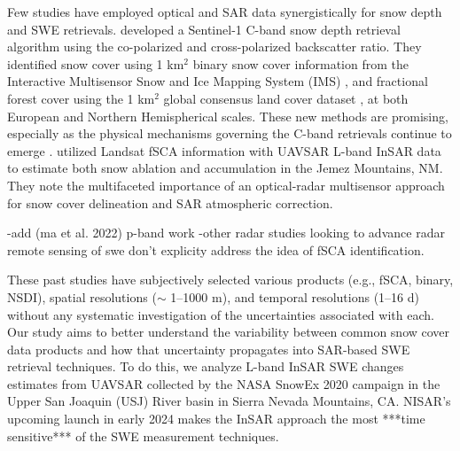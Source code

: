 Few studies have employed optical and SAR data synergistically for snow depth and SWE retrievals. \cite{lievensSnowDepthVariability2019,lievensSentinel1SnowDepth2022} developed a Sentinel-1 C-band snow depth retrieval algorithm using the co-polarized and cross-polarized backscatter ratio. They identified snow cover using 1 km$^{2}$ binary snow cover information from the Interactive Multisensor Snow and Ice Mapping System (IMS) \citep{u.s.nationalicecenterIMSDailyNorthern2008, ramsayInteractiveMultisensorSnow1998, helfrichEnhancementsForthcomingDevelopments2007}, and fractional forest cover using the 1 km$^{2}$ global consensus land cover dataset \citep{tuanmuGlobal1kmConsensus2014}, at both European and Northern Hemispherical scales. These new methods are promising, especially as the physical mechanisms governing the C-band retrievals continue to emerge \citep{zhuModelingScatteringDense2023}. \cite{tarriconeEstimatingSnowAccumulation2023a} utilized Landsat fSCA information with UAVSAR \citep{hensleyUAVSARInstrumentDescription2008} L-band InSAR data to estimate both snow ablation and accumulation in the Jemez Mountains, NM. They note the multifaceted importance of an optical-radar multisensor approach for snow cover delineation and SAR atmospheric correction. 

-add (ma et al. 2022) p-band work
-other radar studies looking to advance radar remote sensing of swe don't explicity address the idea of fSCA identification.


These past studies have subjectively selected various products (e.g., fSCA, binary, NSDI), spatial resolutions ($\sim$ 1--1000 m), and temporal resolutions (1--16 d) without any systematic investigation of the uncertainties associated with each. Our study aims to better understand the variability between common snow cover data products and how that uncertainty propagates into SAR-based SWE retrieval techniques. To do this, we analyze L-band InSAR SWE changes estimates from UAVSAR collected by the NASA SnowEx 2020 \cite{marshallNASASnowEx20202019} campaign in the Upper San Joaquin (USJ) River basin in Sierra Nevada Mountains, CA. NISAR's upcoming launch in early 2024 makes the InSAR approach the most ***time sensitive*** of the SWE measurement techniques.



